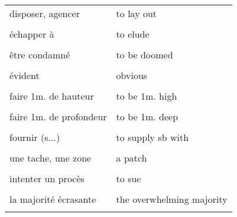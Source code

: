 \documentclass[
  10pt,
]{article}
\begin{document}
\begin{longtable}{ll}
disposer, agencer & to lay out\\

\cellcolor{gray!6}{durer} & \cellcolor{gray!6}{to last}\\

échapper à & to elude\\

\cellcolor{gray!6}{esquisser} & \cellcolor{gray!6}{to sketch}\\

être condamné & to be doomed\\

\cellcolor{gray!6}{être susceptible de} & \cellcolor{gray!6}{to be likely to}\\

évident & obvious\\

\cellcolor{gray!6}{exact, précis} & \cellcolor{gray!6}{accurate}\\

faire 1m. de hauteur & to be 1m. high\\

\cellcolor{gray!6}{faire 1m. de large} & \cellcolor{gray!6}{to be 1m. wide}\\

faire 1m. de profondeur & to be 1m. deep\\

\cellcolor{gray!6}{fournir (p...)} & \cellcolor{gray!6}{to provide sb with}\\

fournir (s...) & to supply sb with\\

\cellcolor{gray!6}{il semble que} & \cellcolor{gray!6}{it looks as if}\\

une tache, une zone & a patch\\

\cellcolor{gray!6}{incliner} & \cellcolor{gray!6}{to tilt}\\

intenter un procès & to sue\\

\cellcolor{gray!6}{interdire} & \cellcolor{gray!6}{to ban}\\

la majorité écrasante & the overwhelming majority\\

\cellcolor{gray!6}{la poitrine} & \cellcolor{gray!6}{the chest}\\


\end{longtable}
\end{document}
